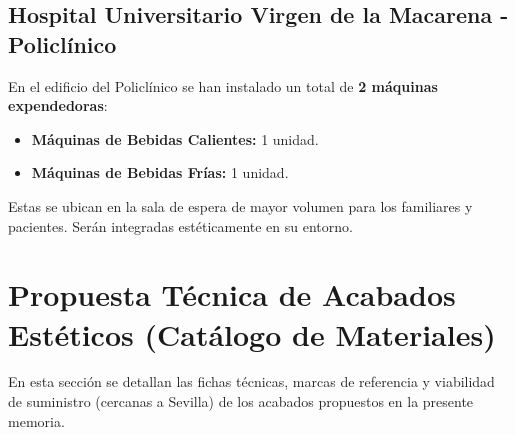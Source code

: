 \documentclass[12pt,a4paper]{article}
\newcommand{\todo}[1]{#1}
\begin{document}
\subsection{Hospital Universitario Virgen de la Macarena - Policlínico}
En el edificio del Policlínico se han instalado un total de \textbf{2 máquinas expendedoras}:
\begin{itemize}
    \item \textbf{Máquinas de Bebidas Calientes:} 1 unidad.
    \item \textbf{Máquinas de Bebidas Frías:} 1 unidad.
\end{itemize}

\todo{Estas se ubican en la sala de espera de mayor volumen para los familiares y pacientes. Serán integradas estéticamente en su entorno.}


\section{Propuesta Técnica de Acabados Estéticos (Catálogo de Materiales)} \label{sec:catalogo_materiales}
En esta sección se detallan las fichas técnicas, marcas de referencia y viabilidad de suministro (cercanas a Sevilla) de los acabados propuestos en la presente memoria.
\end{document}
